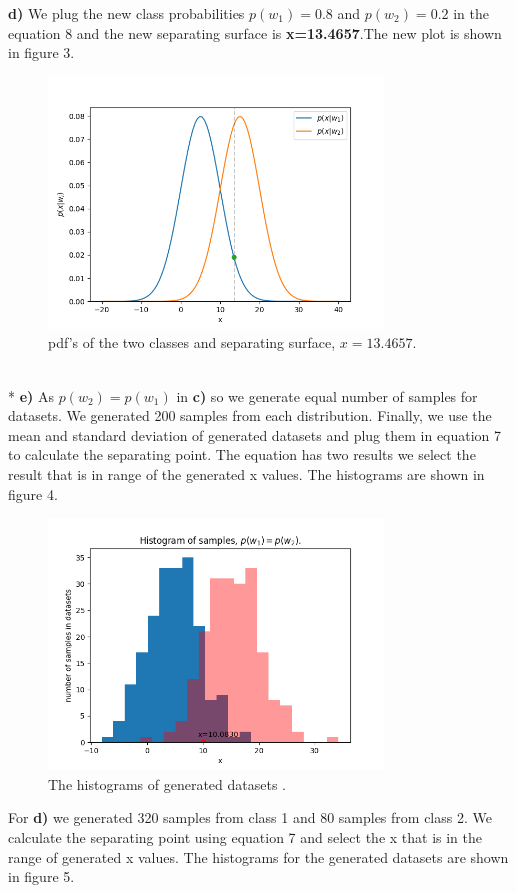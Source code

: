 \documentclass[12pt]{article}
\begin{document}
\newpage
\textbf{d)} We plug the new class probabilities $p(w_{1})=0.8$ and $p(w_{2})=0.2$ in the equation 8 and the new separating surface is \textbf{x=13.4657}.The new plot is shown in figure 3.
\begin{figure}[h]
  \centerline{\includegraphics[width=3.5in]{pdfs1.png}}
  \caption{pdf's of the two classes and separating surface, $x=13.4657$.}
  \label{fig:Pdf's of classes pw1=0.8}
\end{figure}\\*
\textbf{e)} As $p(w_{2})=p(w_{1})$ in \textbf{c)} so we generate equal number of samples for datasets. We generated 200 samples from each distribution. Finally, we use the mean and standard deviation of generated datasets and plug them in equation 7 to calculate the separating point. The equation has two results we select the result that is in range of the generated x values. The histograms are shown in figure 4.
 \begin{figure}[h]
  \centerline{\includegraphics[width=3.5in]{hist05.png}}
  \caption{The histograms of generated datasets .}
  \label{fig:Histograms pw1=pw2}
\end{figure}\newpage
For \textbf{d)} we generated 320 samples from class 1 and 80 samples from class 2. We calculate the separating point using equation 7 and select the x that is in the range of generated x values. The histograms for the generated datasets are shown in figure 5. 
\end{document}
